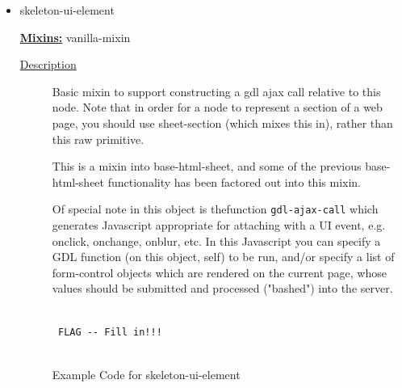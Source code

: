 \documentclass [11pt]{book}
\begin{document}
\begin{itemize}
\item {}skeleton-ui-element


\textbf{
\underline{Mixins:}} vanilla-mixin





\begin{description}

\item [
\underline{Description}]


Basic mixin to support constructing a gdl ajax call 
relative to this node. Note that in order for a node to represent a section of a 
web page, you should use sheet-section (which mixes this in), rather than this raw 
primitive. 

This is a mixin into base-html-sheet, and some of the previous base-html-sheet 
functionality has been factored out into this mixin. 

Of special note in this object is thefunction \texttt{gdl-ajax-call} which generates 
Javascript appropriate for attaching with a UI event, e.g. onclick, onchange, 
onblur, etc. In this Javascript you can specify a GDL function (on this object, self) 
to be run, and/or specify a list of form-control objects which are rendered on 
the current page, whose values should be submitted and processed ("bashed") into the 
server.



\end{description}




\begin{figure}
\begin{lrbox}{\boxedverb}
\begin{minipage}{\linewidth}
{\small

\begin{verbatim}

 FLAG -- Fill in!!!


\end{verbatim}}
\end{minipage}
\end{lrbox}
\fbox{\usebox{\boxedverb}}

\caption{Example Code for skeleton-ui-element}

\label{fig:example-code-skeleton-ui-element}

\end{figure}






\end{itemize}
\end{document}
